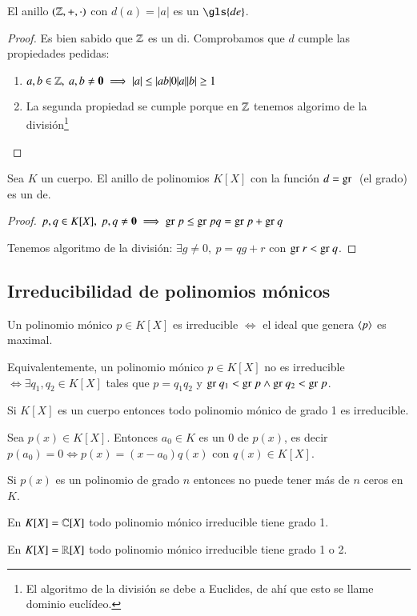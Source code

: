 \begin{ej}
	El anillo $(\mathbb{Z}, +, \cdot)$ con $d(a) = |a|$ es un $\gls{de}$.
\end{ej}

\begin{proof}
	Es bien sabido que $\mathbb{Z}$ es un \gls{di}. Comprobamos que $d$ cumple las propiedades pedidas:
	\begin{enumerate}
		\item $a,b \in \mathbb{Z},\ a,b \neq \mathbf{0} \implies |a| \leq |ab| 0 |a||b| \geq 1$
		\item La segunda propiedad se cumple porque en $\mathbb{Z}$ tenemos algorimo de la división\footnote{El algoritmo de la división se debe a Euclides, de ahí que esto se llame dominio euclídeo.}
	\end{enumerate}
\end{proof}

\begin{ej}
	Sea $K$ un cuerpo. El anillo de polinomios $K[X]$ con la función $d = \text{gr }$ (el grado) es un \gls{de}.
\end{ej}

\begin{proof}
	\item $p,q \in K[X],\ p,q \neq \mathbf{0} \implies \text{gr } p \leq \text{gr } pq = \text{gr } p + \text{gr } q$
	\item Tenemos algoritmo de la división: $\exists g \neq 0,\ p = qg + r$ con $\text{gr } r < \text{gr } q$.
\end{proof}

\subsection{Irreducibilidad de polinomios mónicos}

\begin{dfn}
	Un polinomio mónico $p \in K[X]$ es irreducible $\iff$ el ideal que genera $\langle p\rangle$ es maximal.
	
	Equivalentemente, un polinomio mónico $p \in K[X]$ no es irreducible $\iff \exists q_1, q_2 \in K[X]$ tales que $p = q_1 q_2$ y $\text{gr } q_1 < \text{gr } p \land \text{gr } q_2 < \text{gr } p$.
\end{dfn}

\begin{obs}
	Si $K[X]$ es un cuerpo entonces todo polinomio mónico de grado 1 es irreducible.
\end{obs}

\begin{pro}
	Sea $p(x) \in K[X]$. Entonces $a_0 \in K$ es un $0$ de $p(x)$, es decir $p(a_0) = 0 \iff p(x) = (x-a_0)q(x)$ con $q(x) \in K[X]$.
\end{pro}

\begin{obs}
	Si $p(x)$ es un polinomio de grado $n$ entonces no puede tener más de $n$ ceros en $K$.
\end{obs}


\begin{pro}
	En $K[X] = \mathbb{C}[X]$ todo polinomio mónico irreducible tiene grado 1.
\end{pro}

\begin{pro}
	En $K[X] = \mathbb{R}[X]$ todo polinomio mónico irreducible tiene grado 1 o 2.
\end{pro}